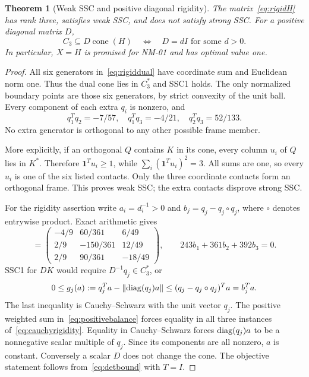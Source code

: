 \documentclass[11pt]{article}
\newtheorem{theorem}{Theorem}[section]
\theoremstyle{definition}\newtheorem{definition}[theorem]{Definition}
\newcommand{\e}{\mathbf1}\newcommand{\cone}{\operatorname{cone}}
\newcommand{\norm}[1]{\left\lVert#1\right\rVert}\newcommand{\Tr}{\mathcal T}
\begin{document}
\begin{theorem}[Weak SSC and positive diagonal rigidity]
\label{thm:rigid}
The matrix~\eqref{eq:rigidH} has rank three, satisfies weak SSC, and does not satisfy strong SSC. For a positive diagonal matrix $D$,
\begin{equation}
 C_3\subseteq D\cone(H)\quad\Longleftrightarrow\quad D=dI\text{ for some }d>0.
 \label{eq:rigidity}
\end{equation}
In particular, $X=H$ is promised for NM-01 and has optimal value one.
\end{theorem}
\begin{proof}
All six generators in~\eqref{eq:rigiddual} have coordinate sum and Euclidean norm one. Thus the dual cone lies in $C_3^*$ and SSC1 holds. The only normalized boundary points are those six generators, by strict convexity of the unit ball. Every component of each extra $q_i$ is nonzero, and
\begin{equation}
 q_1^Tq_2=-7/57,\quad q_1^Tq_3=-4/21,\quad q_2^Tq_3=52/133.
\end{equation}
No extra generator is orthogonal to any other possible frame member.

More explicitly, if an orthogonal $Q$ contains $K$ in its cone, every column $u_i$ of $Q$ lies in $K^*$. Therefore $\e^Tu_i\ge1$, while $\sum_i(\e^Tu_i)^2=3$. All sums are one, so every $u_i$ is one of the six listed contacts. Only the three coordinate contacts form an orthogonal frame. This proves weak SSC; the extra contacts disprove strong SSC.

For the rigidity assertion write $a_i=d_i^{-1}>0$ and $b_j=q_j-q_j\circ q_j$, where $\circ$ denotes entrywise product. Exact arithmetic gives
\begin{equation}
 [b_1\ b_2\ b_3]=
 \begin{pmatrix}
 -4/9&60/361&6/49\\
 2/9&-150/361&12/49\\
 2/9&90/361&-18/49
 \end{pmatrix},\qquad
 243b_1+361b_2+392b_3=0.
 \label{eq:positivebalance}
\end{equation}
SSC1 for $DK$ would require $D^{-1}q_j\in C_3^*$, or
\begin{equation}
 0\le g_j(a):=q_j^Ta-\norm{\diag(q_j)a}
       \le(q_j-q_j\circ q_j)^Ta=b_j^Ta.
 \label{eq:cauchyrigidity}
\end{equation}
The last inequality is Cauchy--Schwarz with the unit vector $q_j$. The positive weighted sum in~\eqref{eq:positivebalance} forces equality in all three instances of~\eqref{eq:cauchyrigidity}. Equality in Cauchy--Schwarz forces $\operatorname{diag}(q_j)a$ to be a nonnegative scalar multiple of $q_j$. Since its components are all nonzero, $a$ is constant. Conversely a scalar $D$ does not change the cone. The objective statement follows from~\eqref{eq:detbound} with $T=I$.
\end{proof}
\end{document}
